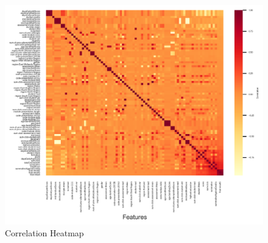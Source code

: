 \documentclass[11pt, a4paper]{article}
\begin{document}
		

	

\begin{figure}[b]
	\centering
	\includegraphics[width=\linewidth]{heatmap.png} 
	\caption{Correlation Heatmap}
	\label{fig:heatmap}
\end{figure}
\end{document}
